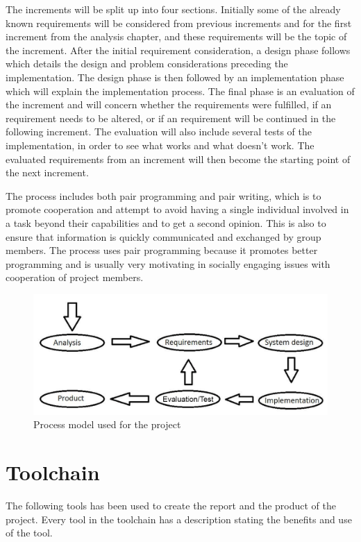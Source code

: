The increments will be split up into four sections. Initially some of the already known requirements will be considered from previous increments and for the first increment from the analysis chapter, and these requirements will be the topic of the increment.
After the initial requirement consideration, a design phase follows which details the design and problem considerations preceding the implementation. The design phase is then followed by an implementation phase which will explain the implementation process. The final phase is an evaluation of the increment and will concern whether the requirements were fulfilled, if an requirement needs to be altered, or if an requirement will be continued in the following increment. The evaluation will also include several tests of the implementation, in order to see what works and what doesn't work. The evaluated requirements from an increment will then become the starting point of the next increment. 


The process includes both pair programming and pair writing, which is to promote cooperation and attempt to avoid having a single individual involved in a task beyond their capabilities and to get a second opinion. This is also to ensure that information is quickly communicated and exchanged by group members. The process uses pair programming because it promotes better programming and is usually very motivating in socially engaging issues with cooperation of project members.


\begin{figure}[h]
	\centering
	\includegraphics[scale=0.30]{billeder/process-model}
	\caption{Process model used for the project}
	\label{pm}
\end{figure}


\chapter*{Toolchain}
The following tools has been used to create the report and the product of the project. Every tool in the toolchain has a description stating the benefits and use of the tool.


